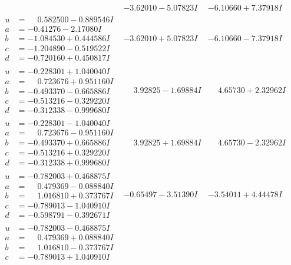 \documentclass[1p]{elsarticle_modified}
\theoremstyle{definition}
\begin{document}
$$\begin{array}{c|c|c}
 & -3.62010 - 5.07823 I & -6.10660 + 7.37918 I \\ \hline\begin{aligned}
u &= \phantom{-}0.582500 - 0.889546 I \\
a &= -0.41276 - 2.17080 I \\
b &= -1.084530 + 0.444586 I \\
c &= -1.204890 - 0.519522 I \\
d &= -0.720160 + 0.450817 I\end{aligned}
 & -3.62010 + 5.07823 I & -6.10660 - 7.37918 I \\ \hline\begin{aligned}
u &= -0.228301 + 1.040040 I \\
a &= \phantom{-}0.723676 + 0.951160 I \\
b &= -0.493370 - 0.665886 I \\
c &= -0.513216 - 0.329220 I \\
d &= -0.312338 - 0.999680 I\end{aligned}
 & \phantom{-}3.92825 - 1.69884 I & \phantom{-}4.65730 + 2.32962 I \\ \hline\begin{aligned}
u &= -0.228301 - 1.040040 I \\
a &= \phantom{-}0.723676 - 0.951160 I \\
b &= -0.493370 + 0.665886 I \\
c &= -0.513216 + 0.329220 I \\
d &= -0.312338 + 0.999680 I\end{aligned}
 & \phantom{-}3.92825 + 1.69884 I & \phantom{-}4.65730 - 2.32962 I \\ \hline\begin{aligned}
u &= -0.782003 + 0.468875 I \\
a &= \phantom{-}0.479369 - 0.088840 I \\
b &= \phantom{-}1.016810 + 0.373767 I \\
c &= -0.789013 - 1.040910 I \\
d &= -0.598791 - 0.392671 I\end{aligned}
 & -0.65497 - 3.51390 I & -3.54011 + 4.44478 I \\ \hline\begin{aligned}
u &= -0.782003 - 0.468875 I \\
a &= \phantom{-}0.479369 + 0.088840 I \\
b &= \phantom{-}1.016810 - 0.373767 I \\
c &= -0.789013 + 1.040910 I \\

\end{aligned}
\end{array}$$
\end{document}
